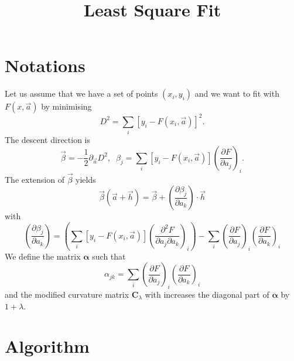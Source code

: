 \documentclass[aps]{revtex4}
\newcommand{\mymat}[1]{\boldsymbol{#1}}
\begin{document}
\title{Least Square Fit}
\maketitle
	
\section{Notations}
Let us assume that we have a set of points $(x_i,y_i)$ and we want to fit
with $F(x,\vec{a})$ by minimising
\begin{equation}
	D^2 = \sum_i\left[ y_i - F\left(x_i,\vec{a}\right)\right]^2.
\end{equation}
The descent direction is
\begin{equation}
	\vec{\beta} = -\dfrac{1}{2}\partial_{\vec{a}} D^2,
	 \;\; \beta_j = \sum_i \left[y_i - F\left(x_i,\vec{a}\right)\right] \left(\dfrac{\partial F}{\partial a_j}\right)_i.
\end{equation}
The extension of $\vec\beta$ yields
\begin{equation}
	\vec{\beta}\left(\vec{a}+\vec{h}\right) = \vec{\beta} + \left(\dfrac{\partial \beta_j}{\partial a_k}\right) \cdot \vec{h}
\end{equation}
with
\begin{equation}
	\left(\dfrac{\partial \beta_j}{\partial a_k}\right) = 
	\left(
	 \sum_i \left[y_i - F\left(x_i,\vec{a}\right)\right] \left(\dfrac{\partial^2 F}{\partial a_j\partial a_k}\right)_i
	 \right) - \sum_i \left(\dfrac{\partial F}{\partial a_j}\right)_i\left(\dfrac{\partial F}{\partial a_k}\right)_i
\end{equation}
We define the matrix $\mymat{\alpha}$ such that
\begin{equation}
		\alpha_{jk} = \sum_i \left(\dfrac{\partial F}{\partial a_j}\right)_i\left(\dfrac{\partial F}{\partial a_k}\right)_i
\end{equation}
and the modified curvature matrix $\mymat{C}_\lambda$ with increases the diagonal part of $\mymat{\alpha}$ by $1+\lambda$.

\section{Algorithm}
\end{document}
